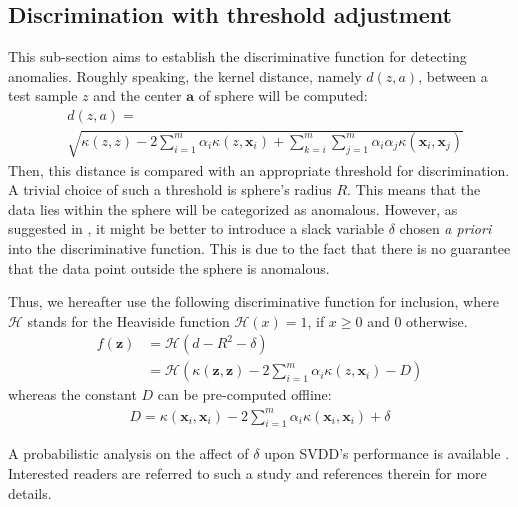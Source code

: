 \documentclass[conference]{IEEEtran}
\theoremstyle{problemstyle}
\begin{document}
\subsection{Discrimination with threshold adjustment}

This sub-section aims to establish the discriminative function for detecting anomalies. Roughly speaking, the kernel distance, namely $d \left( z, a \right)$, between a test sample $z$ and the center $\mathbf{a}$ of sphere will be computed:
\begin{align}
&d \left( z, a \right) = \nonumber \\ &\sqrt{\kappa \left( z, z \right) - 2 \sum_{i=1}^m \alpha_i \kappa \left( z, \mathbf{x}_i \right) + \sum_{k=i}^m \sum_{j=1}^m \alpha_i \alpha_j \kappa \left( \mathbf{x}_i, \mathbf{x}_j \right)}
\end{align}
Then, this distance is compared with an appropriate threshold for discrimination. A trivial choice of such a threshold is sphere's radius $R$. This means that the data lies within the sphere will be categorized as anomalous. However, as suggested in \cite[Section~7.1]{shawe2004kernel}, it might be better to introduce a slack variable $\delta$ chosen \emph{a priori} into the discriminative function. This is due to the fact that there is no guarantee that the data point outside the sphere is anomalous.

Thus, we hereafter use the following discriminative function for inclusion, where $\mathcal{H}$ stands for the Heaviside function $\mathcal{H}(x) = 1$, if $x \ge 0$ and $0$ otherwise.
\begin{align}
f \left( \mathbf{z} \right) &= \mathcal{H} \left( d - R^2 - \delta \right) \nonumber \\
&= \mathcal{H} \left( \kappa \left( \mathbf{z}, \mathbf{z} \right) - 2 \sum_{i=1}^m \alpha_i \kappa \left( z, \mathbf{x}_i \right) - D \right) \label{eq:decision_fcn}
\end{align}
whereas the constant $D$ can be pre-computed offline:
\begin{align}
D = \kappa \left( \mathbf{x}_i, \mathbf{x}_i \right) - 2 \sum_{i=1}^m \alpha_i \kappa \left( \mathbf{x}_i, \mathbf{x}_i \right) + \delta
\end{align}

A probabilistic analysis on the affect of $\delta$ upon SVDD's performance is available \cite[Theorem~7.9]{shawe2004kernel}. Interested readers are referred to such a study and references therein for more details. 
\end{document}
